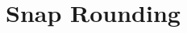
\ccParDims

\chapter{Snap Rounding}
\label{chapterSnapRoundibg}
\\
\vspace*{-15mm}
\minitoc
\vspace*{30mm}



